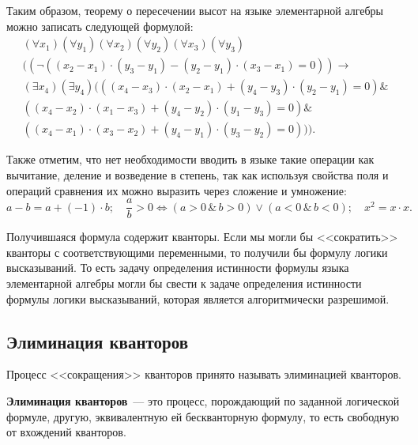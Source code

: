 Таким образом, теорему о пересечении высот на языке элементарной алгебры можно записать следующей формулой:
\begin{gather*}
    (\forall x_1)(\forall y_1)(\forall x_2)(\forall y_2)(\forall x_3)(\forall y_3) \\
    (
        (
            \lnot
            (
                (x_2 - x_1)\cdot(y_3 - y_1) - (y_2 - y_1)\cdot(x_3 - x_1) = 0
            )
        )
        \to \\
        (\exists x_4)(\exists y_4)
        (
           (
                (x_4 - x_3)\cdot(x_2 - x_1) + (y_4 - y_3)\cdot(y_2 - y_1) = 0
            ) \& \\
            (
                (x_4 - x_2)\cdot(x_1 - x_3) + (y_4 - y_2)\cdot(y_1 - y_3) = 0
            ) \& \\
            (
                (x_4 - x_1)\cdot(x_3 - x_2) + (y_4 - y_1)\cdot(y_3 - y_2) = 0
            )
        )
    ).
\end{gather*}


Также отметим, что нет необходимости вводить в языке такие операции как вычитание, деление и возведение в степень, так как используя свойства поля и операций сравнения их можно выразить через сложение и умножение:
\begin{equation*}
    a-b=a+(-1)\cdot b; \quad \frac{a}{b} > 0 \Leftrightarrow (a > 0 \, \& \, b > 0) \lor (a < 0 \, \& \, b < 0); \quad x^2 = x \cdot x.
\end{equation*}

Получившаяся формула содержит кванторы. Если мы могли бы <<сократить>> кванторы с соответствующими переменными, то получили бы формулу логики высказываний. То есть задачу определения истинности формулы языка элементарной алгебры могли бы свести к задаче определения истинности формулы логики высказываний, которая является алгоритмически разрешимой.

\subsection{Элиминация кванторов}

Процесс <<сокращения>> кванторов принято называть элиминацией кванторов.

\begin{definition}
    \textbf{Элиминация кванторов}~--- это процесс, порождающий по заданной логической формуле, другую, эквивалентную ей бескванторную формулу, то есть свободную от вхождений кванторов.
\end{definition}

